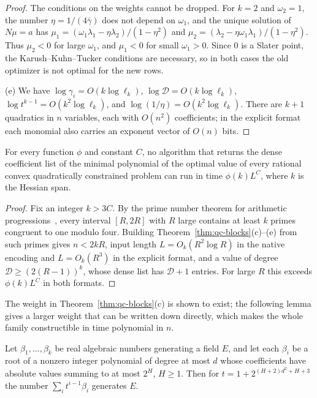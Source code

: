 \begin{proof}
The conditions on the weights cannot be dropped. For $k=2$ and $\omega_2=1$,
the number $\eta=1/(4\bar\gamma)$ does not depend on $\omega_1$, and the
unique solution of $N\mu=a$ has
$\mu_1=(\omega_1\lambda_1-\eta\lambda_2)/(1-\eta^2)$ and
$\mu_2=(\lambda_2-\eta\omega_1\lambda_1)/(1-\eta^2)$. Thus $\mu_2<0$ for
large $\omega_1$, and $\mu_1<0$ for small $\omega_1>0$. Since $0$ is a
Slater point, the Karush--Kuhn--Tucker conditions are necessary, so in both
cases the old optimizer is not optimal for the new rows.

(e) We have $\log\gamma_i=O(k\log\ell_k)$, $\log\mathcal D=O(k\log\ell_k)$,
$\log t^{k-1}=O(k^2\log\ell_k)$, and $\log(1/\eta)=O(k^2\log\ell_k)$. There are
$k+1$ quadratics in $n$ variables, each with $O(n^2)$ coefficients; in the
explicit format each monomial also carries an exponent vector of $O(n)$
bits.
\end{proof}

\begin{corollary}
\label{cor:qc-no-fpt-output}
For every function $\phi$ and constant $C$, no algorithm that returns the
dense coefficient list of the minimal polynomial of the optimal value of
every rational convex quadratically constrained problem can run in time
$\phi(k)L^C$, where $k$ is the Hessian span.
\end{corollary}

\begin{proof}
Fix an integer $k>3C$. By the prime number theorem for arithmetic
progressions~\cite{Davenport2000}, every interval $[R,2R]$ with $R$ large
contains at least $k$ primes congruent to one modulo four. Building
Theorem~\ref{thm:qc-blocks}(c)--(e) from such primes gives $n<2kR$, input
length $L=O_k(R^2\log R)$ in the native encoding and $L=O_k(R^3)$ in the
explicit format, and a value of degree $\mathcal D\ge(2(R-1))^k$, whose
dense list has $\mathcal D+1$ entries. For large $R$ this exceeds
$\phi(k)L^C$ in both formats.
\end{proof}

The weight in Theorem~\ref{thm:qc-blocks}(c) is shown to exist; the following
lemma gives a larger weight that can be written down directly, which makes
the whole family constructible in time polynomial in $n$.

\begin{lemma}
\label{lem:qc-weight}
Let $\beta_1,\ldots,\beta_k$ be real algebraic numbers generating a field
$E$, and let each $\beta_i$ be a root of a nonzero integer polynomial of
degree at most $d$ whose coefficients have absolute values summing to at most
$2^H$, $H\ge1$. Then for $t=1+2^{(H+2)d^2+H+3}$ the number
$\sum_it^{i-1}\beta_i$ generates $E$.
\end{lemma}

